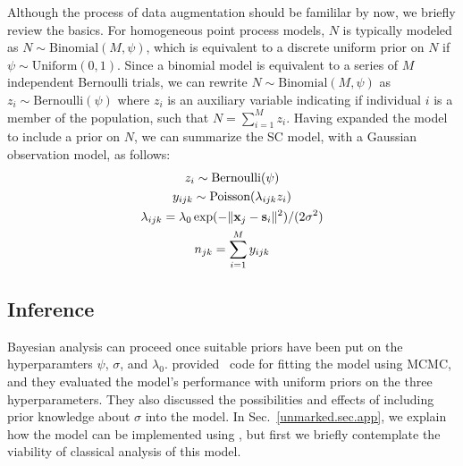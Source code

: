 Although the process of data augmentation should be famililar by now,
we briefly review the basics.
For homogeneous point process models, %
$N$ is typically modeled as
$N \sim \text{Binomial}(M, \psi)$, %
which is equivalent
to a discrete uniform prior on $N$ if $\psi \sim
\text{Uniform}(0,1)$.
Since a binomial model is
equivalent to a series of $M$ independent Bernoulli trials, %
we can rewrite $N \sim \text{Binomial}(M, \psi)$ as $z_i \sim
\text{Bernoulli}(\psi)$ where $z_i$ is an auxiliary variable
indicating if individual $i$ is a member of the population, such that $N =
\sum_{i=1}^M z_i$. Having expanded the model to include a prior on $N$, we
can summarize the SC model, with a Gaussian observation model, as follows:
\begin{gather*}
  z_i \sim \text{Bernoulli}(\psi) \\
  y_{ijk} \sim \text{Poisson}(\lambda_{ijk} z_i) \\
  \lambda_{ijk} = \lambda_0\exp(-\|{\bf x}_j - {\bf s}_i\|^2)/(2\sigma^2) \\
  n_{jk} = \sum_{i=1}^M y_{ijk} %
\end{gather*}



\subsection{Inference}

Bayesian analysis can proceed once suitable priors have been put on
the hyperparamters $\psi$, $\sigma$, and
$\lambda_0$. \citet{chandler_royle:2012} provided \R~code for fitting
the model using MCMC, and they evaluated the model's performance with
uniform priors on the three hyperparameters. They also discussed the
possibilities and effects of including prior knowledge about $\sigma$
into the model. In Sec.~\ref{unmarked.sec.app}, we explain how the model can be
implemented using \jags, but first we briefly contemplate the viability of classical
analysis of this model.

